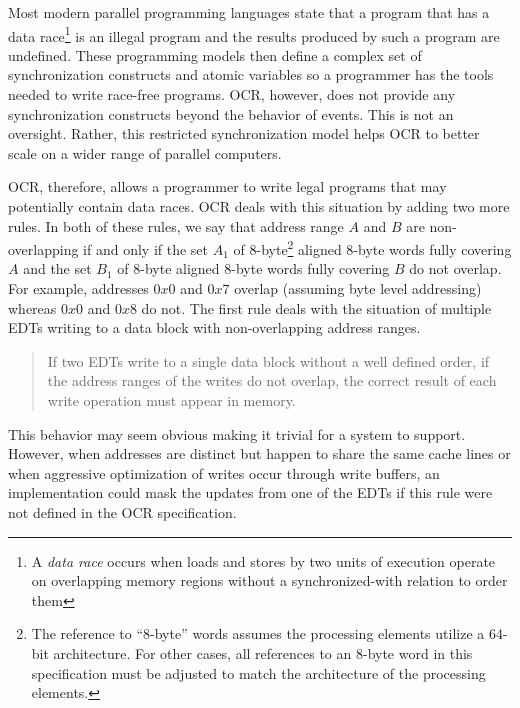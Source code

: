 Most modern parallel programming languages state that a program that
has a data race\footnote{A \emph{data race} occurs when loads and
stores by two units of execution operate on overlapping memory regions
without a synchronized-with relation to order them} is an illegal
program and the results produced by such a program are undefined.
These programming models then define a complex set of synchronization
constructs and atomic variables so a programmer has the tools needed
to write race-free programs. OCR, however, does not provide any
synchronization constructs beyond the behavior of events. This is not
an oversight. Rather, this restricted synchronization model helps OCR
to better scale on a wider range of parallel computers.

OCR, therefore, allows a programmer to write legal programs that may
potentially contain data races. OCR deals with this situation by
adding two more rules. In both of these rules, we say that address
range $A$ and $B$ are non-overlapping if and only if the set $A_1$ of
8-byte\footnote{The reference to ``8-byte'' words assumes the processing elements
utilize a 64-bit architecture. For other cases, all references to an 8-byte
word in this specification must be adjusted to match the architecture of the processing elements.}
aligned 8-byte words fully covering $A$ and the set $B_1$ of
8-byte aligned 8-byte words fully covering $B$ do not overlap. For
example, addresses
$0x0$ and $0x7$ overlap (assuming byte level addressing) whereas
$0x0$ and $0x8$ do not.
The first rule deals with the situation of multiple
EDTs writing to a data block with non-overlapping address ranges.
\begin{quote}
If two EDTs write to a single data block without a well defined order,
if the address ranges of the writes do not overlap, the correct result
of each write operation must appear in memory.
\end{quote}

This behavior may seem obvious making it trivial for a system to
support. However, when addresses are distinct but happen to share the
same cache lines or when aggressive optimization of writes occur
through write buffers, an implementation could mask the updates from
one of the EDTs if this rule were not defined in the OCR
specification.

